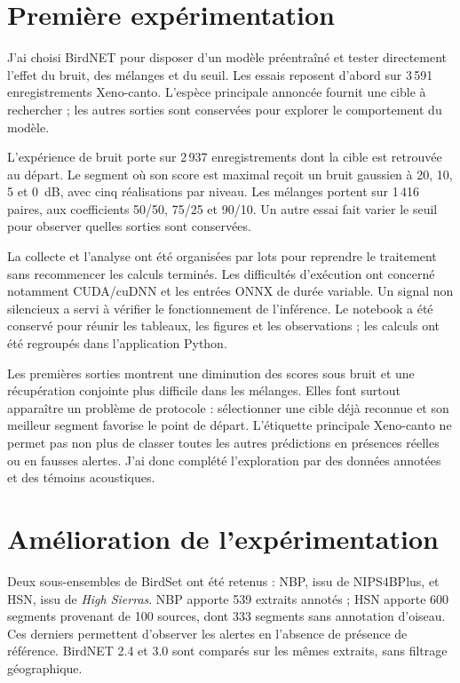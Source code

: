 \documentclass[11pt,a4paper]{article}
\begin{document}
\section{Première expérimentation}

J'ai choisi BirdNET pour disposer d'un modèle préentraîné et tester directement
l'effet du bruit, des mélanges et du seuil. Les essais reposent d'abord sur
3\,591 enregistrements Xeno-canto. L'espèce principale annoncée fournit une
cible à rechercher ; les autres sorties sont conservées pour explorer le
comportement du modèle.

L'expérience de bruit porte sur 2\,937 enregistrements dont la cible est
retrouvée au départ. Le segment où son score est maximal reçoit un bruit
gaussien à 20, 10, 5 et 0~dB, avec cinq réalisations par niveau. Les mélanges
portent sur 1\,416 paires, aux coefficients 50/50, 75/25 et 90/10. Un autre
essai fait varier le seuil pour observer quelles sorties sont conservées.

La collecte et l'analyse ont été organisées par lots pour reprendre le
traitement sans recommencer les calculs terminés. Les difficultés d'exécution
ont concerné notamment CUDA/cuDNN et les entrées ONNX de durée variable.
Un signal non silencieux a servi à vérifier le fonctionnement de l'inférence.
Le notebook a été conservé pour réunir les tableaux, les figures et les
observations ; les calculs ont été regroupés dans l'application Python.

Les premières sorties montrent une diminution des scores sous bruit et une
récupération conjointe plus difficile dans les mélanges. Elles font surtout
apparaître un problème de protocole : sélectionner une cible déjà reconnue
et son meilleur segment favorise le point de départ. L'étiquette principale
Xeno-canto ne permet pas non plus de classer toutes les autres prédictions
en présences réelles ou en fausses alertes. J'ai donc complété l'exploration
par des données annotées et des témoins acoustiques.

\section{Amélioration de l'expérimentation}

Deux sous-ensembles de BirdSet ont été retenus : NBP, issu de NIPS4BPlus,
et HSN, issu de \emph{High Sierras}. NBP apporte 539 extraits annotés ;
HSN apporte 600 segments provenant de 100 sources, dont 333 segments sans
annotation d'oiseau. Ces derniers permettent d'observer les alertes en
l'absence de présence de référence. BirdNET 2.4 et 3.0 sont comparés sur
les mêmes extraits, sans filtrage géographique.
\end{document}
